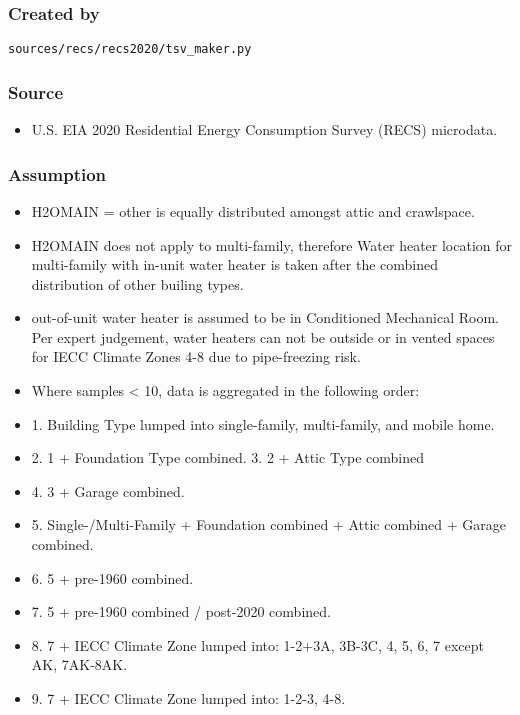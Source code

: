 \subsubsection{Created by}\label{created-by-149}

\texttt{sources/recs/recs2020/tsv\_maker.py}

\subsubsection{Source}\label{source-151}

\begin{itemize}
 
\item
  U.S. EIA 2020 Residential Energy Consumption Survey (RECS) microdata.
\end{itemize}

\subsubsection{Assumption}\label{assumption-86}

\begin{itemize}
 
\item
  H2OMAIN = other is equally distributed amongst attic and crawlspace.
\item
  H2OMAIN does not apply to multi-family, therefore Water heater
  location for multi-family with in-unit water heater is taken after the
  combined distribution of other builing types.
\item
  out-of-unit water heater is assumed to be in Conditioned Mechanical
  Room. Per expert judgement, water heaters can not be outside or in
  vented spaces for IECC Climate Zones 4-8 due to pipe-freezing risk.
\item
  Where samples \textless{} 10, data is aggregated in the following
  order:
\item
  1. Building Type lumped into single-family, multi-family, and mobile
  home.
\item
  2. 1 + Foundation Type combined. 3. 2 + Attic Type combined
\item
  4. 3 + Garage combined.
\item
  5. Single-/Multi-Family + Foundation combined + Attic combined +
  Garage combined.
\item
  6. 5 + pre-1960 combined.
\item
  7. 5 + pre-1960 combined / post-2020 combined.
\item
  8. 7 + IECC Climate Zone lumped into: 1-2+3A, 3B-3C, 4, 5, 6, 7 except
  AK, 7AK-8AK.
\item
  9. 7 + IECC Climate Zone lumped into: 1-2-3, 4-8.
\end{itemize}

